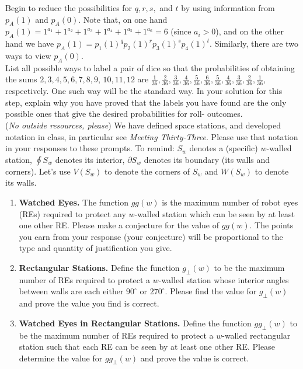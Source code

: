 \documentclass{article}
\begin{document}
 Begin to reduce the possibilities for $q,r,s,$ and $t$ by using information from $p_A(1)$ and $p_A(0)$.  Note that, on one hand $p_A(1) = 1^{a_1} + 1^{a_2} + 1^{a_3} + 1^{a_4} + 1^{a_5}+1^{a_6} = 6$ (since $a_i > 0$), and on the other hand we have $p_A(1) = p_1(1)^qp_2(1)^rp_3(1)^sp_4(1)^t$.  Similarly, there are two ways to view $p_A(0)$.\\
 List all possible ways to label a pair of dice so that the probabilities of obtaining the sums $2, 3, 4, 5, 6, 7, 8, 9$, $10, 11, 12$ are $\frac{1}{36}, \frac{2}{36}, \frac{3}{36}, \frac{4}{36}, \frac{5}{36}, \frac{6}{36}, \frac{5}{36}, \frac{4}{36}, \frac{3}{36}, \frac{2} {36},\frac{1}{36}$, respectively.  One such way will be the standard way.  In your solution for this step, explain why you have proved that the labels you have found are the only possible ones that give the desired probabilities for roll- outcomes.
\vspace{2em}
\noindent \underline{\hspace{5in}}
\vspace{2em}
\\
\noindent(\emph{No outside resources, please}) We have defined space stations, and developed notation in class, in particular see \emph{Meeting Thirty-Three}.  Please use that notation in your responses to these prompts.  To remind: $S_w$ denotes a (specific) $w$-walled station, $\oint S_w$ denotes its interior, $\partial S_w$ denotes its boundary (its walls and corners).  Let's use $V(S_w)$ to denote the corners of $S_w$ and $W(S_w)$ to denote its walls.\\
\begin{enumerate}
	\item {\bf Watched Eyes.} The function $gg(w)$ is the maximum number of robot eyes (REs) required to protect any $w$-walled station which can be seen by at least one other RE.  Please make a conjecture for the value of $gg(w)$.  The points you earn from your response (your conjecture) will be proportional to the type and quantity of justification you give.  
	\item {\bf Rectangular Stations.}  Define the function $g_{\perp}(w)$ to be the maximum number of REs required to protect a $w$-walled station whose interior angles between walls are each either $90^{\circ}$ or $270^{\circ}$.  Please find the value for $g_{\perp}(w)$ and prove the value you find is correct.
	\item {\bf Watched Eyes in Rectangular Stations.} Define the function $gg_{\perp} (w)$ to be the maximum number of REs required to protect a $w$-walled rectangular station such that each RE can be seen by at least one other RE. Please determine the value for $gg_{\perp}(w)$ and prove the value is correct.
\end{enumerate}
\noindent \underline{\hspace{5in}}
\end{document}
